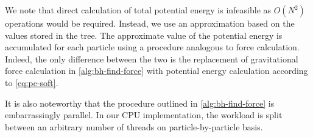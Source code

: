 We note that direct calculation of total potential energy is infeasible as $O(N^2)$ operations would be required.
Instead, we use an approximation based on the values stored in the tree.
The approximate value of the potential energy is accumulated for each particle using a procedure analogous to force calculation.
Indeed, the only difference between the two is the replacement of gravitational force calculation in \autoref{alg:bh-find-force} with potential energy calculation according to \autoref{eq:pe-soft}.

It is also noteworthy that the procedure outlined in \autoref{alg:bh-find-force} is embarrassingly parallel.
In our CPU implementation, the workload is split between an arbitrary number of threads on particle-by-particle basis.
